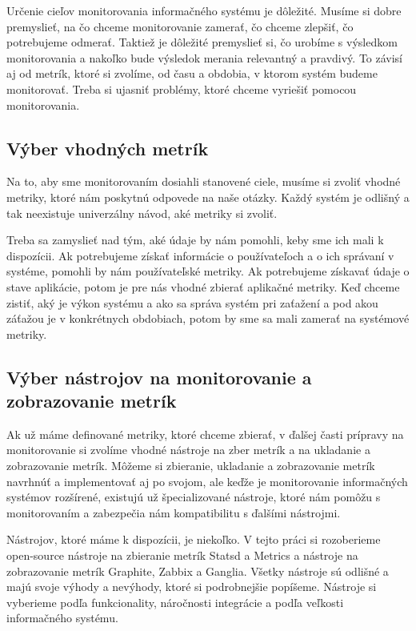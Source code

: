 \documentclass[a4paper, upjsfrontpage, disablespecwarning, thesismargins, thesislinespacing]{rnthesis}
\begin{document}
Určenie cieľov monitorovania informačného systému je dôležité.
Musíme si dobre premyslieť, na čo chceme monitorovanie zamerať, čo chceme zlepšiť, čo potrebujeme odmerať.
Taktiež je dôležité premyslieť si, čo urobíme s výsledkom monitorovania a nakoľko bude výsledok merania relevantný a pravdivý.
To závisí aj od metrík, ktoré si zvolíme, od času a obdobia, v ktorom systém budeme monitorovať.
Treba si ujasniť problémy, ktoré chceme vyriešiť pomocou monitorovania.

\subsection*{Výber vhodných metrík}

Na to, aby sme monitorovaním dosiahli stanovené ciele, musíme si zvoliť vhodné metriky, 
	ktoré nám poskytnú odpovede na naše otázky.
Každý systém je odlišný a tak neexistuje univerzálny návod, aké metriky si zvoliť.

Treba sa zamyslieť nad tým, aké údaje by nám pomohli, keby sme ich mali k dispozícii.
Ak potrebujeme získať informácie o používateľoch a o ich správaní v systéme, pomohli by nám používateľské metriky.
Ak potrebujeme získavať údaje o stave aplikácie, potom je pre nás vhodné zbierať aplikačné metriky.
Keď chceme zistiť, aký je výkon systému a ako sa správa systém pri zaťažení a pod akou záťažou je v konkrétnych obdobiach, potom by sme sa mali zamerať na systémové metriky.

\subsection*{Výber nástrojov na monitorovanie a zobrazovanie metrík}

Ak už máme definované metriky, ktoré chceme zbierať, v ďalšej časti prípravy na monitorovanie si zvolíme vhodné nástroje na zber 	metrík a na ukladanie a zobrazovanie metrík.
Môžeme si zbieranie, ukladanie a zobrazovanie metrík navrhnúť a implementovať aj po svojom, ale keďže je monitorovanie informačných systémov rozšírené, existujú už špecializované nástroje, ktoré nám pomôžu s monitorovaním a zabezpečia nám kompatibilitu s ďalšími nástrojmi.

Nástrojov, ktoré máme k dispozícii, je niekoľko.
V tejto práci si rozoberieme open-source nástroje na zbieranie metrík Statsd a Metrics a nástroje na zobrazovanie metrík Graphite, Zabbix a Ganglia.
Všetky nástroje sú odlišné a majú svoje výhody a nevýhody, ktoré si podrobnejšie popíšeme.
Nástroje si vyberieme podľa funkcionality, náročnosti integrácie a podľa veľkosti informačného systému.
\end{document}
